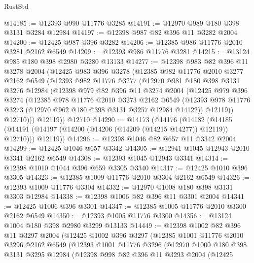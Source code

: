 \begin{lexlean}{RustStd}
\begin{coremodule}
@14185 := @12393 @990 @11776 @3285
@14191 := @12970 @989 @180 @398 @3131 @3284 @12984
@14197 := @12398 @987 @82 @396 @11 @3282 @2004
@14200 := @12425 @987 @396 @3282
@14206 := @12385 @986 @11776 @2010 @3281 @2162 @6549
@14209 := @12393 @986 @11776 @3281
@14215 := @13124 @985 @180 @398 @2980 @3280 @13133
@14277 := @12398
    @983
    @82
    @396
    @11
    @3278
    @2004
    (@12425
      @983
      @396
      @3278
      (@12385
        @982
        @11776
        @2010
        @3277
        @2162
        @6549
        (@12393
          @982
          @11776
          @3277
          (@12970
            @981
            @180
            @398
            @3131
            @3276
            @12984
            (@12398
              @979
              @82
              @396
              @11
              @3274
              @2004
              (@12425
                @979
                @396
                @3274
                (@12385
                  @978
                  @11776
                  @2010
                  @3273
                  @2162
                  @6549
                  (@12393 @978 @11776 @3273 (@12970 @962 @180 @398 @3131 @3257 @12984 @14122))
                  @12119))
              @12710)))
        @12119))
    @12710
@14290 := @14173
    (@14176
      (@14182
        (@14185 (@14191 (@14197 (@14200 (@14206 (@14209 (@14215 @14277)) @12119)) @12710)))
        @12119))
@14296 := @12398 @1046 @82 @657 @11 @3342 @2004
@14299 := @12425 @1046 @657 @3342
@14305 := @12941 @1045 @12943 @2010 @3341 @2162 @6549
@14308 := @12393 @1045 @12943 @3341
@14314 := @12398 @1010 @1044 @396 @659 @3305 @3340
@14317 := @12425 @1010 @396 @3305
@14323 := @12385 @1009 @11776 @2010 @3304 @2162 @6549
@14326 := @12393 @1009 @11776 @3304
@14332 := @12970 @1008 @180 @398 @3131 @3303 @12984
@14338 := @12398 @1006 @82 @396 @11 @3301 @2004
@14341 := @12425 @1006 @396 @3301
@14347 := @12385 @1005 @11776 @2010 @3300 @2162 @6549
@14350 := @12393 @1005 @11776 @3300
@14356 := @13124 @1004 @180 @398 @2980 @3299 @13133
@14449 := @12398
    @1002
    @82
    @396
    @11
    @3297
    @2004
    (@12425
      @1002
      @396
      @3297
      (@12385
        @1001
        @11776
        @2010
        @3296
        @2162
        @6549
        (@12393
          @1001
          @11776
          @3296
          (@12970
            @1000
            @180
            @398
            @3131
            @3295
            @12984
            (@12398
              @998
              @82
              @396
              @11
              @3293
              @2004
              (@12425

\end{coremodule}
\end{lexlean}
